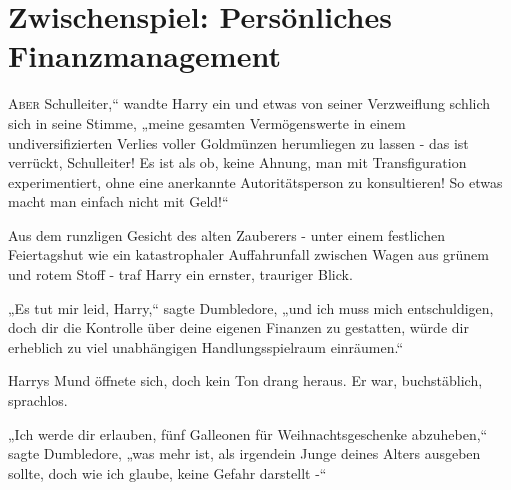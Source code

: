 \chapter{Zwischenspiel: Persönliches Finanzmanagement}

\lettrine[ante=„]{A}{ber} Schulleiter,“ wandte Harry ein und etwas von seiner Verzweiflung schlich sich in seine Stimme, „meine gesamten Vermögenswerte in einem undiversifizierten Verlies voller Goldmünzen herumliegen zu lassen - das ist verrückt, Schulleiter! Es ist als ob, keine Ahnung, man mit Transfiguration experimentiert, ohne eine anerkannte Autoritätsperson zu konsultieren! So etwas macht man einfach nicht mit Geld!“

Aus dem runzligen Gesicht des alten Zauberers - unter einem festlichen Feiertagshut wie ein katastrophaler Auffahrunfall zwischen Wagen aus grünem und rotem Stoff - traf Harry ein ernster, trauriger Blick.

„Es tut mir leid, Harry,“ sagte Dumbledore, „und ich muss mich entschuldigen, doch dir die Kontrolle über deine eigenen Finanzen zu gestatten, würde dir erheblich zu viel unabhängigen Handlungsspielraum einräumen.“

Harrys Mund öffnete sich, doch kein Ton drang heraus. Er war, buchstäblich, sprachlos.

„Ich werde dir erlauben, fünf Galleonen für Weihnachtsgeschenke abzuheben,“ sagte Dumbledore, „was mehr ist, als irgendein Junge deines Alters ausgeben sollte, doch wie ich glaube, keine Gefahr darstellt -“

